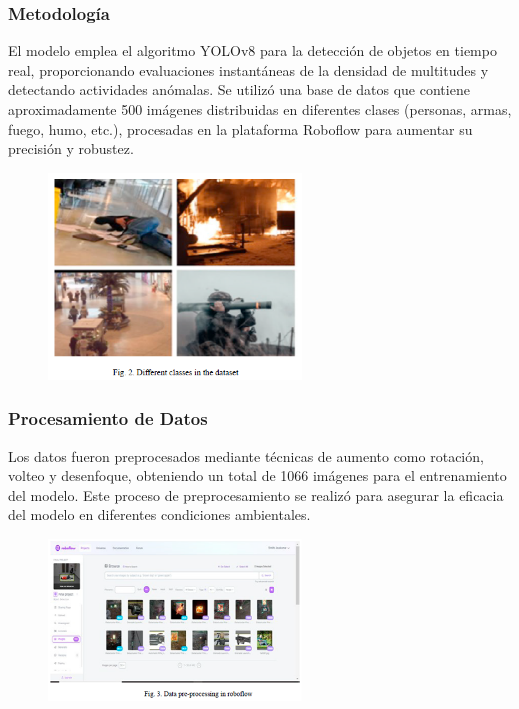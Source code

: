 \documentclass[listof=nochaptergap,12pt,times,authoryear]{report}
\begin{document}
\subsubsection{Metodología}
El modelo emplea el algoritmo YOLOv8 para la detección de objetos en tiempo real, proporcionando evaluaciones instantáneas de la densidad de multitudes y detectando actividades anómalas. Se utilizó una base de datos que contiene aproximadamente 500 imágenes distribuidas en diferentes clases (personas, armas, fuego, humo, etc.), procesadas en la plataforma Roboflow para aumentar su precisión y robustez.

\begin{figure}[h] %
    \centering
    \includegraphics[width=0.6\textwidth]{met1.png} %
    \label{fig:ejemplo} %
\end{figure}

\subsubsection{Procesamiento de Datos}
Los datos fueron preprocesados mediante técnicas de aumento como rotación, volteo y desenfoque, obteniendo un total de 1066 imágenes para el entrenamiento del modelo. Este proceso de preprocesamiento se realizó para asegurar la eficacia del modelo en diferentes condiciones ambientales.

\begin{figure}[h] %
    \centering
    \includegraphics[width=0.6\textwidth]{pro1.png} %
    \label{fig:ejemplo} %
\end{figure}
\end{document}
